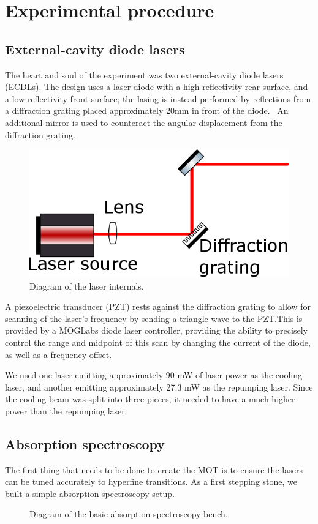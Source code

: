 \documentclass[11pt,twoside,a4paper]{article}
\begin{document}
\section{Experimental procedure}
\subsection{External-cavity diode lasers}
The heart and soul of the experiment was two external-cavity diode lasers (ECDLs). The design uses a laser diode
with a high-reflectivity rear surface, and a low-reflectivity front surface; the lasing is instead performed by reflections
from a diffraction grating placed approximately 20mm in front of the diode.~\cite{moglabsecd} An additional mirror is used to counteract
the angular displacement from the diffraction grating.
\begin{figure}[h]
    \centering
    \includegraphics[width=.3\textwidth]{images/ecdl-internals.png}
    \caption{Diagram of the laser internals.}
\end{figure}

A piezoelectric transducer (PZT) rests against the diffraction grating to allow for scanning of the laser's frequency by sending a
triangle wave to the PZT.\@ This is provided by a MOGLabs diode laser controller, providing the ability to precisely control the range
and midpoint of this scan by changing the current of the diode, as well as a frequency offset.

We used one laser emitting approximately 90 mW of laser power as the cooling laser, and another emitting approximately 27.3 mW as the
repumping laser. Since the cooling beam was split into three pieces, it needed to have a much higher power than the repumping laser.
\subsection{Absorption spectroscopy}
The first thing that needs to be done to create the MOT is to ensure the lasers can be tuned accurately to hyperfine transitions. As a
first stepping stone, we built a simple absorption spectroscopy setup.
\begin{figure}[h]
    \centering
    \caption{Diagram of the basic absorption spectroscopy bench.}
\end{figure}
\end{document}
